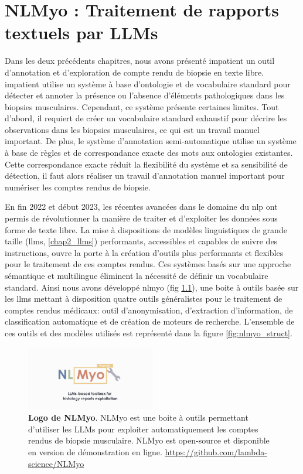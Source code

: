 \chapter{NLMyo : Traitement de rapports textuels par LLMs}\label{chap_nlmyo}
Dans les deux précédents chapitres, nous avons présenté \gls{impatient} un outil d'annotation et d'exploration de compte rendu de biopsie en texte libre. \gls{impatient} utilise un système à base d'ontologie et de vocabulaire standard pour détecter et annoter la présence ou l'absence d'éléments pathologiques dans les biopsies musculaires. Cependant, ce système présente certaines limites. Tout d'abord, il requiert de créer un vocabulaire standard exhaustif pour décrire les observations dans les biopsies musculaires, ce qui est un travail manuel important. De plus, le système d'annotation semi-automatique utilise un système à base de règles et de correspondance exacte des mots aux ontologies existantes. Cette correspondance exacte réduit la flexibilité du système et sa sensibilité de détection, il faut alors réaliser un travail d'annotation manuel important pour numériser les comptes rendus de biopsie. 

En fin 2022 et début 2023, les récentes avancées dans le domaine du \gls{nlp} ont permis de révolutionner la manière de traiter et d'exploiter les données sous forme de texte libre. La mise à dispositions de modèles linguistiques de grande taille (\gls{llms}, \ref{chap2_llms}) performants, accessibles et capables de suivre des instructions, ouvre la porte à la création d'outils plus performants et flexibles pour le traitement de ces comptes rendus. Ces systèmes basés sur une approche sémantique et multilingue éliminent la nécessité de définir un vocabulaire standard. Ainsi nous avons développé \gls{nlmyo} (fig \ref{fig:nlmyo_logo}), une boite à outils basée sur les \gls{llms} mettant à disposition quatre outils généralistes pour le traitement de comptes rendus médicaux: outil d'anonymisation, d'extraction d'information, de classification automatique et de création de moteurs de recherche. L'ensemble de ces outils et des modèles utilisés est représenté dans la figure \ref{fig:nlmyo_struct}.

\begin{figure}[htbp]
 \centering
 \includegraphics[width=0.5\textwidth]{figures/nlmyo_banner.png}
 \caption[Logo NLMyo]{\textbf{Logo de NLMyo}. NLMyo est une boite à outils permettant d'utiliser les LLMs pour exploiter automatiquement les comptes rendus de biopsie musculaire. NLMyo est open-source et disponible en version de démonstration en ligne. \url{https://github.com/lambda-science/NLMyo}}
 \label{fig:nlmyo_logo}
\end{figure}

